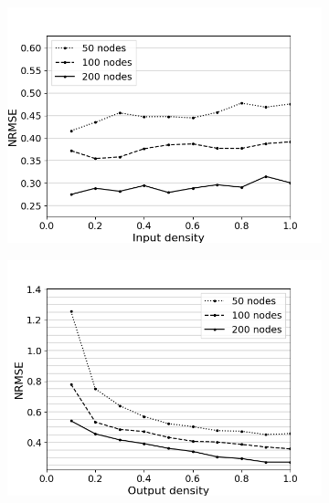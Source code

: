 \begin{figure}[htbp]
  \centering
  \begin{subfigure}{.3\textwidth}
    \centering
    \includegraphics[width=\linewidth]{img/input_density_all.png}
  \end{subfigure}
  \begin{subfigure}{.3\textwidth}
    \centering
    \includegraphics[width=\linewidth]{img/output_density_all.png}
  \end{subfigure}
  \begin{subfigure}{.3\textwidth}
    \centering

\end{subfigure}
\end{figure}
